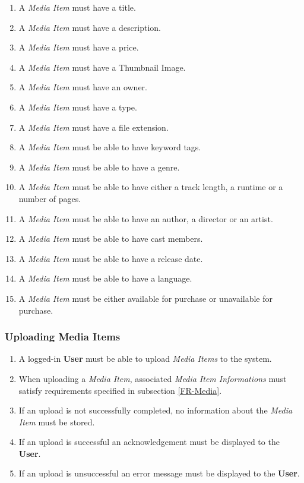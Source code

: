 \begin{enumerate}[label=\textbf{FR-\twodigits*}, resume]
	\item A \textit{Media Item} must have a title.
	\item A \textit{Media Item} must have a description.
	\item A \textit{Media Item} must have a price.
	\item A \textit{Media Item} must have a Thumbnail Image.
	\item A \textit{Media Item} must have an owner.
	\item A \textit{Media Item} must have a type.
	\item A \textit{Media Item} must have a file extension.
	\item A \textit{Media Item} must be able to have keyword tags.
	\item A \textit{Media Item} must be able to have a genre.
	\item A \textit{Media Item} must be able to have either a track length, a runtime or a number of pages.
	\item A \textit{Media Item} must be able to have an author, a director or an artist.
	\item A \textit{Media Item} must be able to have cast members.
	\item A \textit{Media Item} must be able to have a release date.
	\item A \textit{Media Item} must be able to have a language.
	
	\item A \textit{Media Item} must be either available for purchase or unavailable for purchase.
\end{enumerate}

\subsubsection {Uploading Media Items}

\begin{enumerate}[label=\textbf{FR-\twodigits*}, resume]
	\item A logged-in \textbf{User} must be able to upload \textit{Media Items} to the system.
	\item When uploading a \textit{Media Item}, associated \textit{Media Item Informations} must satisfy requirements specified in subsection \ref{FR-Media}.
	\item If an upload is not successfully completed, no information about the \textit{Media Item} must be stored.
	\item If an upload is successful an acknowledgement must be displayed to the \textbf{User}.
	\item If an upload is unsuccessful an error message must be displayed to the \textbf{User}. 
\end{enumerate}

